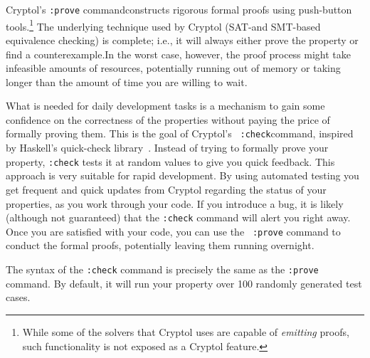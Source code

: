 
Cryptol's {\tt :prove} command\indCmdProve constructs rigorous formal
proofs using push-button tools.\footnote{While some of the solvers
  that Cryptol uses are capable of \emph{emitting} proofs, such
  functionality is not exposed as a Cryptol feature.}  The underlying
technique used by Cryptol (SAT-\glosSAT and SMT-based\glosSMT
equivalence checking) is complete\indProofCompleteness; i.e., it will
always either prove the property or find a
counterexample.\indCounterExample In the worst case, however, the
proof process might take infeasible amounts of resources, potentially
running out of memory or taking longer than the amount of time you are
willing to wait.

What is needed for daily development tasks is a mechanism to gain some
confidence on the correctness of the properties without paying the
price of formally proving them.  This is the goal of Cryptol's {\tt
  :check}\indCmdCheck command, inspired by Haskell's quick-check
library~\cite{quickcheck}.  Instead of trying to formally prove your
property, {\tt :check} tests it at random values to give you quick
feedback.  This approach is very suitable for rapid development.  By
using automated testing you get frequent and quick updates from
Cryptol regarding the status of your properties, as you work through
your code. If you introduce a bug, it is likely (although not
guaranteed) that the {\tt :check} command will alert you right
away. Once you are satisfied with your code, you can use the {\tt
  :prove} command to conduct the formal proofs, potentially leaving
them running overnight.

The syntax of the {\tt :check} command is precisely the same as the
{\tt :prove} command. By default, it will run your property over 100
randomly generated test cases.

